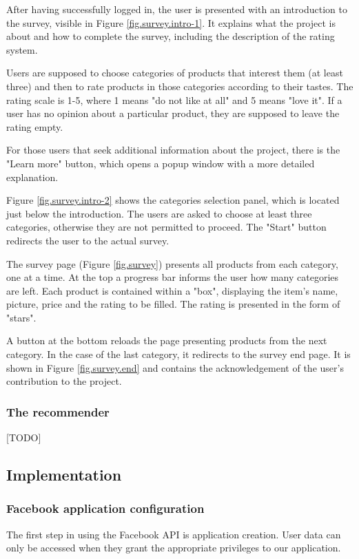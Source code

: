 \documentclass[12pt]{report}
\begin{document}
After having successfully logged in, the user is presented with an introduction to the survey, visible in Figure \ref{fig.survey.intro-1}. It explains what the project is about and how to complete the survey, including the description of the rating system.

Users are supposed to choose categories of products that interest them (at least three) and then to rate products in those categories according to their tastes. The rating scale is 1-5, where 1 means "do not like at all" and 5 means "love it". If a user has no opinion about a particular product, they are supposed to leave the rating empty.

For those users that seek additional information about the project, there is the "Learn more" button, which opens a popup window with a more detailed explanation.

Figure \ref{fig.survey.intro-2} shows the categories selection panel, which is located just below the introduction. The users are asked to choose at least three categories, otherwise they are not permitted to proceed. The "Start" button redirects the user to the actual survey.

The survey page (Figure \ref{fig.survey}) presents all products from each category, one at a time. At the top a progress bar informs the user how many categories are left. Each product is contained within a "box", displaying the item's name, picture, price and the rating to be filled. The rating is presented in the form of "stars".

A button at the bottom reloads the page presenting products from the next category. In the case of the last category, it redirects to the survey end page. It is shown in Figure \ref{fig.survey.end} and contains the acknowledgement of the user's contribution to the project.

\subsubsection{The recommender}
[TODO]

\subsection{Implementation}

\subsubsection{Facebook application configuration}
The first step in using the Facebook API is application creation. User data can only be accessed when they grant the appropriate privileges to our application.
\end{document}
